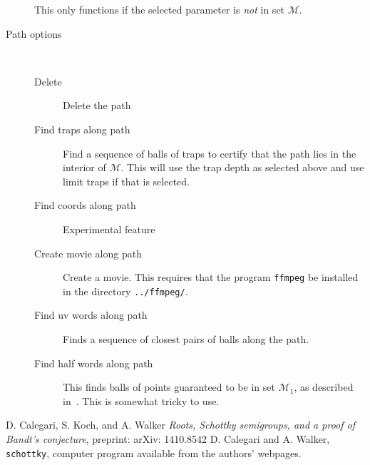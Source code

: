 \documentclass{amsart}
\begin{document}
\begin{description}
This only functions if the selected parameter is \emph{not} in set $\mathcal{M}$.
\vspace{5mm}
\item[Path options] ~
\begin{description}
\item[Delete] Delete the path
\item[Find traps along path] Find a sequence of balls of traps to certify that the 
path lies in the interior of $\mathcal{M}$.  This will use the trap depth 
as selected above and use limit traps if that is selected.
\item[Find coords along path] Experimental feature
\item[Create movie along path] Create a movie.  This requires that the 
program \texttt{ffmpeg} be installed in the directory \texttt{../ffmpeg/}.
\item[Find uv words along path] Finds a sequence of closest pairs of balls 
along the path.
\item[Find half words along path] This finds balls of points guaranteed to be in 
set $\mathcal{M}_1$, as described in~\cite{paper}.  This is somewhat tricky to use.
\end{description}
\end{description}


\begin{thebibliography}{99}
	D. Calegari, S. Koch, and A. Walker
	\emph{Roots, Schottky semigroups, and a proof of Bandt's conjecture},
	preprint: arXiv: 1410.8542
    D. Calegari and A. Walker,
    \texttt{schottky}, computer program available from the authors' webpages.
\end{thebibliography}
\end{document}
